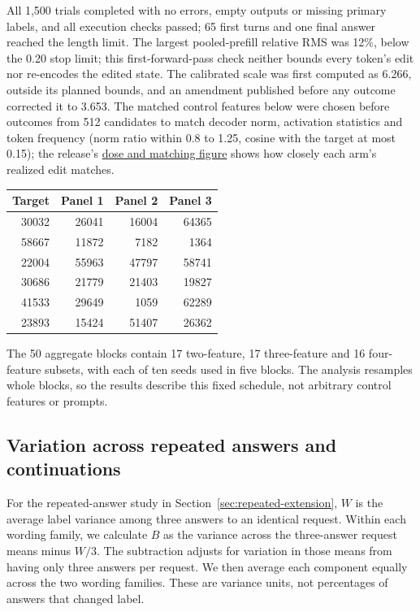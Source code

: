 \documentclass[11pt]{article}
\newcommand{\artifact}[2]{\href{https://github.com/tdj28/llm_selfref_pre/blob/f5e906e1737bc71bf20b642af1d698018eec82fe/#1}{#2}}
\begin{document}
All 1,500 trials completed with no errors, empty outputs or missing primary
labels, and all execution checks passed; 65 first turns and one final answer
reached the length limit. The largest pooled-prefill relative RMS was 12\%,
below the 0.20 stop limit; this first-forward-pass check neither bounds
every token's edit nor re-encodes the edited state. The calibrated scale
was first computed as 6.266, outside its planned bounds, and an amendment
published before any outcome corrected it to 3.653. The matched control
features below were chosen before outcomes from 512 candidates to match
decoder norm, activation statistics and token frequency (norm ratio within
0.8 to 1.25, cosine with the target at most 0.15); the release's
\artifact{data/public_sae_consciousness_gating/confirmatory_v1_20260710/figures/technical_dose_and_matching.pdf}{dose and matching figure}
shows how closely each arm's realized edit matches.

\begin{center}\small
\begin{tabular}{@{}rrrr@{}}
\toprule
Target & Panel 1 & Panel 2 & Panel 3\\
\midrule
30032 & 26041 & 16004 & 64365\\
58667 & 11872 & 7182 & 1364\\
22004 & 55963 & 47797 & 58741\\
30686 & 21779 & 21403 & 19827\\
41533 & 29649 & 1059 & 62289\\
23893 & 15424 & 51407 & 26362\\
\bottomrule
\end{tabular}
\end{center}

The 50 aggregate blocks contain 17 two-feature, 17 three-feature and 16
four-feature subsets, with each of ten seeds used in five blocks. The analysis
resamples whole blocks, so the results describe this fixed schedule, not
arbitrary control features or prompts.

\FloatBarrier

\FloatBarrier

\FloatBarrier

\FloatBarrier

\subsection{Variation across repeated answers and continuations}
\label{app:repeated-variation}

For the repeated-answer study in Section~\ref{sec:repeated-extension},
$W$ is the average label variance among three answers to an identical
request. Within each wording family, we calculate $B$ as the variance
across the three-answer request means minus $W/3$. The subtraction adjusts
for variation in those means from having only three answers per request.
We then average each component equally across the two wording families.
These are variance units, not percentages of answers that changed label.
\end{document}
